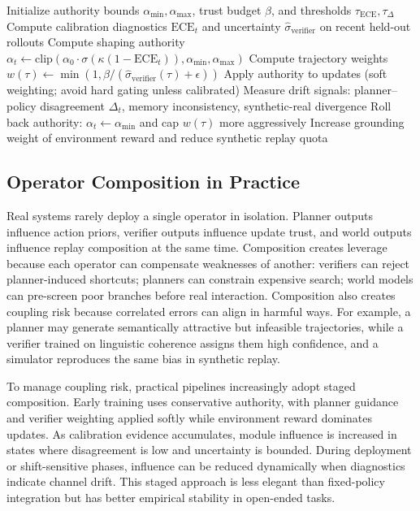 ﻿\documentclass[conference]{IEEEtran}
\begin{document}
\begin{algorithm}[t]
\caption{Authority escalation with rollback triggers}
\label{alg:authority_escalation}
\begin{algorithmic}[1]
\State Initialize authority bounds $\alpha_{\min},\alpha_{\max}$, trust budget $\beta$, and thresholds $\tau_{\text{ECE}},\tau_{\Delta}$
  \State Compute calibration diagnostics $\mathrm{ECE}_t$ and uncertainty $\hat{\sigma}_{\text{verifier}}$ on recent held-out rollouts
  \State Compute shaping authority $\alpha_t \leftarrow \mathrm{clip}\!\left(\alpha_0\cdot\sigma(\kappa(1-\mathrm{ECE}_t)),\alpha_{\min},\alpha_{\max}\right)$
  \State Compute trajectory weights $w(\tau) \leftarrow \min(1,\beta/(\hat{\sigma}_{\text{verifier}}(\tau)+\epsilon))$
  \State Apply authority to updates (soft weighting; avoid hard gating unless calibrated)
  \State Measure drift signals: planner--policy disagreement $\Delta_t$, memory inconsistency, synthetic-real divergence
    \State Roll back authority: $\alpha_t\leftarrow\alpha_{\min}$ and cap $w(\tau)$ more aggressively
    \State Increase grounding weight of environment reward and reduce synthetic replay quota
  \EndIf
\EndFor
\end{algorithmic}
\end{algorithm}

\subsection{Operator Composition in Practice}
Real systems rarely deploy a single operator in isolation. Planner outputs influence action priors, verifier outputs influence update trust, and world outputs influence replay composition at the same time. Composition creates leverage because each operator can compensate weaknesses of another: verifiers can reject planner-induced shortcuts; planners can constrain expensive search; world models can pre-screen poor branches before real interaction. Composition also creates coupling risk because correlated errors can align in harmful ways. For example, a planner may generate semantically attractive but infeasible trajectories, while a verifier trained on linguistic coherence assigns them high confidence, and a simulator reproduces the same bias in synthetic replay.

To manage coupling risk, practical pipelines increasingly adopt staged composition. Early training uses conservative authority, with planner guidance and verifier weighting applied softly while environment reward dominates updates. As calibration evidence accumulates, module influence is increased in states where disagreement is low and uncertainty is bounded. During deployment or shift-sensitive phases, influence can be reduced dynamically when diagnostics indicate channel drift. This staged approach is less elegant than fixed-policy integration but has better empirical stability in open-ended tasks.
\end{document}

